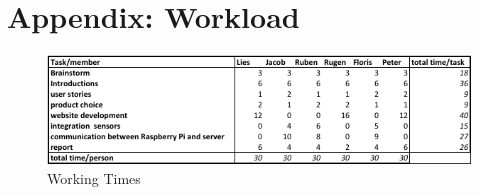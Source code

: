 \section{Appendix: Workload}
\begin{figure}[H]
  \center
  \includegraphics[width=1.5\linewidth, angle=90]{appendix_working_times/workload.png}
  \caption{Working Times}
  \label{image:workload}
\end{figure}
\caption{Wotking Times}
